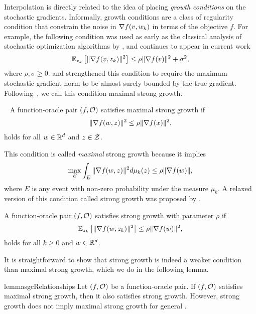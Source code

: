 Interpolation is directly related to the idea of placing \emph{growth conditions} on the stochastic gradients.
Informally, growth conditions are a class of regularity condition that constrain the noise in \( \grad(v, \wk) \) in terms of the objective \( f \).
For example, the following condition was used as early as the classical analysis of stochastic optimization algorithms by \citet{poljak1973pseudogradient}, and continues to appear in current work~\citep{bertsekas2000gradient, khaled2020better}  
\[ \Ek \sbr{\norm{\grad(v, \zk)}^2} \leq \rho \norm{\grad(v)}^2 + \sigma^2,  \]
where \( \rho, \sigma \geq 0 \).
\citet{tseng1998incremental} and \citet{solodov1998incremental} strengthened this condition to require the maximum stochastic gradient norm to be almost surely bounded by the true gradient.
Following~\citet{khaled2020better}, we call this condition maximal strong growth.
\begin{definition}~\label{def:maximal-sg}
    A function-oracle pair \( \rbr{f, \oracle{}} \) satisfies maximal strong growth if  
    \begin{align*}
        \norm{\grad(\w, \z)}^2 \leq \rho \norm{\grad(x)}^2, 
    \end{align*}
    holds for all \( \w \in \R^d \) and \( \z \in \calZ \).
\end{definition}
This condition is called \emph{maximal} strong growth because it implies 
    \[ \max_{E} \int_{E} \norm{\grad(\w, \z)}^2 d\mu_k(\z) \leq \rho \norm{\grad(\w)}, \]
    where \( E \) is any event with non-zero probability under the measure \( \mu_k \). 
A relaxed version of this condition called strong growth was proposed by \citet{vaswani2019fast}.
\begin{definition}\label{def:sgc}
    A function-oracle pair \( \rbr{f, \oracle{}} \) satisfies strong growth with parameter \(\rho \) if
    \[ \Ek \sbr{\norm{\grad(\w, \zk)}^2} \leq \rho \norm{\grad(\w)}^2, \]
    holds for all \( k \geq 0 \) and \( \w \in \R^d \).
\end{definition}
It is straightforward to show that strong growth is indeed a weaker condition than maximal strong growth, which we do in the following lemma.
\begin{restatable}{lemma}{sgcRelationships}\label{thm:sgc-relationships}
    Let \( \rbr{f, \oracle{}} \) be a function-oracle pair. 
    If \( \rbr{f, \oracle{}} \) satisfies maximal strong growth, then it also satisfies strong growth.
    However, strong growth does not imply maximal strong growth for general \oracle{}.  
\end{restatable} 
